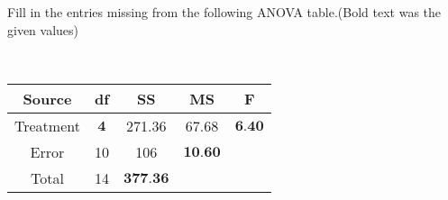 Fill in the entries missing from the following ANOVA table.(Bold text was the given values)

\begin{solution}\renewcommand{\qedsymbol}{}\ \\
    \begin{center}
        \begin{tabular}{ c|   c   c   c   c  }
            Source & df & SS & MS & F\\
            \hline
            Treatment & $\textbf{4}$ & 271.36 & 67.68 & $\textbf{6.40}$\\
            Error & 10 & 106 & $\textbf{10.60}$ & \\
            Total & 14 & $\textbf{377.36}$ &  & 
        \end{tabular}
    \end{center}
\end{solution}